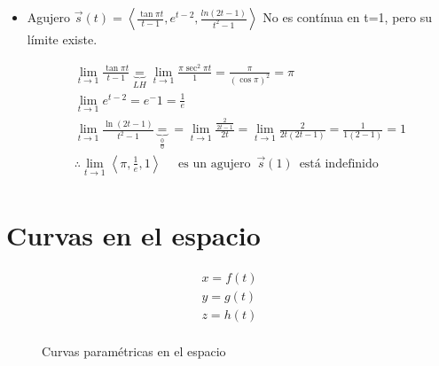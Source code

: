 \begin{itemize}
    \item Agujero $\vec{s}(t) = \left\langle \frac{\tan \pi t }{t-1} , e^{t-2}, \frac{ln(2t-1)}{t^2-1}  \right\rangle $ \newline 
     No es contínua en t=1, pero su límite existe.
     \begin{center}
        \begin{align*}
            \lim_{t \to 1} \frac{\tan \pi t}{t-1} \underbrace{=}_{LH} \lim_{t \to 1} \frac{\pi \sec^2 \pi t }{1} = \frac{\pi}{(\cos \pi)^2} = \pi \\ 
           \lim_{t \to 1} e^{t-2 } = e^-1 = \frac{1}{e} \\ 
           \lim_{t \to 1} \frac{\ln(2t-1)}{t^2-1} \underbrace{=}_{\frac{0}{0}} = \lim_{t \to 1} \frac{\frac{2}{2t-1} }{2t} = \lim_{t \to 1} \frac{2}{2t(2t-1)} = \frac{1}{1(2-1)} = 1 \\ 
           \therefore \lim_{t \to 1} \left\langle \pi, \frac{1}{e}, 1 \right\rangle \quad \text{  es un agujero   } \, \vec{s}(1) \, \text{  está indefinido  } \\   
        \end{align*}
     \end{center}
\end{itemize}


\section{Curvas en el espacio}

\begin{center}
    \begin{align*}
        x = f(t) \\ 
        y = g(t) \\ 
        z = h(t) \\ 
    \end{align*}
\end{center}
\begin{figure}[htbp]
    \centering
    \caption{Curvas paramétricas en el espacio}
    \label{}
\end{figure}

